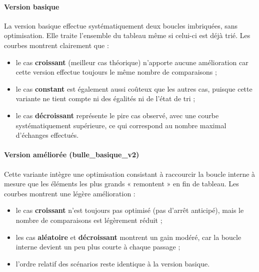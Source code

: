 \documentclass[11pt,a4paper]{article}
\begin{document}
\paragraph{Version basique}
La version basique effectue systématiquement deux boucles imbriquées, sans optimisation.
Elle traite l’ensemble du tableau même si celui-ci est déjà trié. Les courbes montrent
clairement que :
\begin{itemize}
    \item le cas \textbf{croissant} (meilleur cas théorique) n’apporte aucune amélioration
          car cette version effectue toujours le même nombre de comparaisons ;
    \item le cas \textbf{constant} est également aussi coûteux que les autres cas,
          puisque cette variante ne tient compte ni des égalités ni de l’état de tri ;
    \item le cas \textbf{décroissant} représente le pire cas observé, avec une courbe
          systématiquement supérieure, ce qui correspond au nombre maximal
          d’échanges effectués.
\end{itemize}

\paragraph{Version améliorée (bulle\_basique\_v2)}
Cette variante intègre une optimisation consistant à raccourcir la boucle interne
à mesure que les éléments les plus grands « remontent » en fin de tableau.
Les courbes montrent une légère amélioration :
\begin{itemize}
    \item le cas \textbf{croissant} n’est toujours pas optimisé (pas d’arrêt anticipé),
          mais le nombre de comparaisons est légèrement réduit ;
    \item les cas \textbf{aléatoire} et \textbf{décroissant} montrent un gain modéré,
          car la boucle interne devient un peu plus courte à chaque passage ;
    \item l’ordre relatif des scénarios reste identique à la version basique.
\end{itemize}
\end{document}
